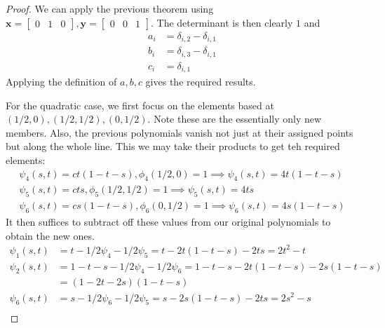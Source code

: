 \documentclass{amsart}
\theoremstyle{plain}
\theoremstyle{definition}
\begin{document}
\begin{proof}
    We can apply the previous theorem using $\mathbf{x} = \begin{bmatrix}
        0 & 1 & 0
    \end{bmatrix}, \mathbf{y} = \begin{bmatrix}
        0 & 0 & 1
    \end{bmatrix}.$
    The determinant is then clearly $1$ and 
    \begin{align*}
        a_i &= \delta_{i,2}-\delta_{i,1}\\
        b_i &= \delta_{i,3}-\delta_{i,1}\\
        c_i &= \delta_{i,1}
    \end{align*}
    Applying the definition of $a,b,c$ gives the required results. 
    \par For the quadratic case, we first focus on the elements based at $(1/2,0),(1/2,1/2),(0,1/2)$. Note these are the essentially only new members. Also, the previous polynomials vanish not just at their assigned points but along the whole line. This we may take their products to get teh required elements:
    \begin{gather*}
        \psi_4(s,t) = ct(1-t-s), \phi_4(1/2,0)=1\implies  \psi_4(s,t) = 4t(1-t-s)\\
        \psi_5(s,t) = cts, \phi_5(1/2,1/2)=1\implies  \psi_5(s,t) = 4ts\\
        \psi_6(s,t) = cs(1-t-s), \phi_6(0,1/2)=1\implies  \psi_6(s,t) = 4s(1-t-s)
    \end{gather*}
    It then suffices to subtract off these values from our original polynomials to obtain the new ones.
     \begin{align*}
        \psi_1(s,t) &= t-1/2\psi_4-1/2\psi_5 = t-2t(1-t-s)-2ts=2t^2-t\\
        \psi_2(s,t) &= 1-t-s- 1/2\psi_4-1/2\psi_6=1-t-s-2t(1-t-s)-2s(1-t-s)\\
        &=(1-2t-2s)(1-t-s)\\
        \psi_6(s,t) &= s-1/2\psi_6-1/2\psi_5=s-2s(1-t-s)-2ts=2s^2-s\\
    \end{align*}
\end{proof}
\end{document}
